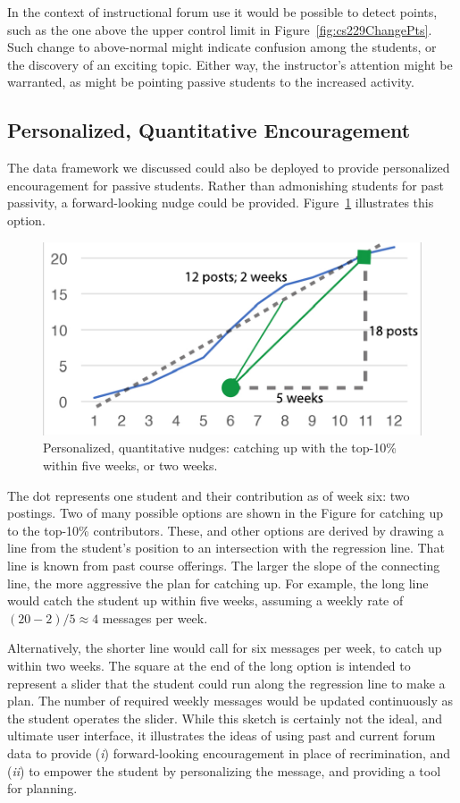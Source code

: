 In the context of instructional forum use it would be possible to
detect points, such as the one above the upper control limit in
Figure~\ref{fig:cs229ChangePts}. Such change to above-normal might
indicate confusion among the students, or the discovery of an exciting
topic. Either way, the instructor's attention might be warranted, as
might be pointing passive students to the increased activity.

\subsection{Personalized, Quantitative Encouragement}
The data framework we discussed could also be deployed to provide
personalized encouragement for passive students. Rather than
admonishing students for past passivity, a forward-looking nudge could
be provided. Figure~\ref{fig:nudgeAngles} illustrates this option.
\begin{figure}[]
       \centering
       \includegraphics{Figs/angleTrajectories.pdf}
       \caption{\textnormal{Personalized, quantitative nudges:
           catching up with the top-10\% within five weeks, or two
           weeks.}}
       \label{fig:nudgeAngles}
\end{figure}
The dot represents one student and their contribution as of week six:
two postings. Two of many possible options are shown in the Figure for
catching up to the top-10\% contributors. These, and other options are
derived by drawing a line from the student's position to an
intersection with the regression line. That line is known from past
course offerings. The larger the slope of the connecting line, the
more aggressive the plan for catching up. For example, the long line
would catch the student up within five weeks, assuming a weekly rate
of $(20-2)/5 \approx 4$ messages per week.

Alternatively, the shorter line would call for six messages per week,
to catch up within two weeks. The square at the end of the long option
is intended to represent a slider that the student could run along the
regression line to make a plan. The number of required weekly messages
would be updated continuously as the student operates the
slider. While this sketch is certainly not the ideal, and ultimate
user interface, it illustrates the ideas of using past and current
forum data to provide ({\em i}) forward-looking encouragement in place
of recrimination, and ({\em ii}) to empower the student by
personalizing the message, and providing a tool for planning.


